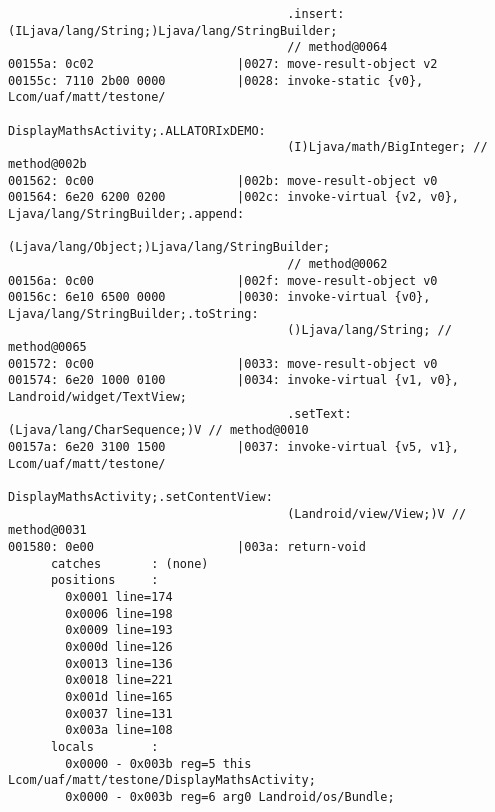 \begin{lstlisting}
                                       .insert:(ILjava/lang/String;)Ljava/lang/StringBuilder;
                                       // method@0064
00155a: 0c02                    |0027: move-result-object v2
00155c: 7110 2b00 0000          |0028: invoke-static {v0}, Lcom/uaf/matt/testone/
                                       DisplayMathsActivity;.ALLATORIxDEMO:
                                       (I)Ljava/math/BigInteger; // method@002b
001562: 0c00                    |002b: move-result-object v0
001564: 6e20 6200 0200          |002c: invoke-virtual {v2, v0}, Ljava/lang/StringBuilder;.append:
                                       (Ljava/lang/Object;)Ljava/lang/StringBuilder;
                                       // method@0062
00156a: 0c00                    |002f: move-result-object v0
00156c: 6e10 6500 0000          |0030: invoke-virtual {v0}, Ljava/lang/StringBuilder;.toString:
                                       ()Ljava/lang/String; // method@0065
001572: 0c00                    |0033: move-result-object v0
001574: 6e20 1000 0100          |0034: invoke-virtual {v1, v0}, Landroid/widget/TextView;
                                       .setText:(Ljava/lang/CharSequence;)V // method@0010
00157a: 6e20 3100 1500          |0037: invoke-virtual {v5, v1}, Lcom/uaf/matt/testone/
                                       DisplayMathsActivity;.setContentView:
                                       (Landroid/view/View;)V // method@0031
001580: 0e00                    |003a: return-void
      catches       : (none)
      positions     :
        0x0001 line=174
        0x0006 line=198
        0x0009 line=193
        0x000d line=126
        0x0013 line=136
        0x0018 line=221
        0x001d line=165
        0x0037 line=131
        0x003a line=108
      locals        :
        0x0000 - 0x003b reg=5 this Lcom/uaf/matt/testone/DisplayMathsActivity;
        0x0000 - 0x003b reg=6 arg0 Landroid/os/Bundle;


\end{lstlisting}
